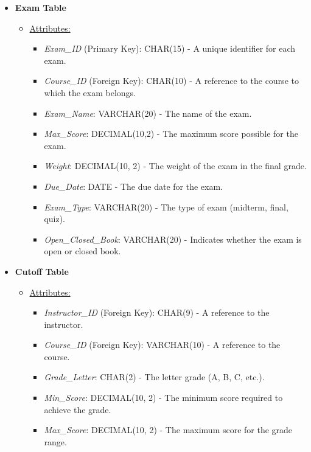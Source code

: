 \documentclass[12pt]{article}
\begin{document}
\begin{itemize}
    \item \textbf{Exam Table}
    \begin{itemize}
        \item \underline{Attributes:}
        \begin{itemize}
            \item \textit{Exam\_ID} (Primary Key): CHAR(15) - A unique identifier for each exam.
            \item \textit{Course\_ID} (Foreign Key): CHAR(10) - A reference to the course to which the exam belongs.
            \item \textit{Exam\_Name}: VARCHAR(20) - The name of the exam.
            \item \textit{Max\_Score}: DECIMAL(10,2) - The maximum score possible for the exam.
            \item \textit{Weight}: DECIMAL(10, 2) - The weight of the exam in the final grade.
            \item \textit{Due\_Date}: DATE - The due date for the exam.
            \item \textit{Exam\_Type}: VARCHAR(20) - The type of exam (midterm, final, quiz).
            \item \textit{Open\_Closed\_Book}: VARCHAR(20) - Indicates whether the exam is open or closed book.
        \end{itemize}
    \end{itemize}
    
    \item \textbf{Cutoff Table}
    \begin{itemize}
        \item \underline{Attributes:}
        \begin{itemize}
            \item \textit{Instructor\_ID} (Foreign Key): CHAR(9) - A reference to the instructor.
            \item \textit{Course\_ID} (Foreign Key): VARCHAR(10) - A reference to the course.
            \item \textit{Grade\_Letter}: CHAR(2) - The letter grade (A, B, C, etc.).
            \item \textit{Min\_Score}: DECIMAL(10, 2) - The minimum score required to achieve the grade.
            \item \textit{Max\_Score}: DECIMAL(10, 2) - The maximum score for the grade range.
        \end{itemize}
    \end{itemize}


\end{itemize}
\end{document}
